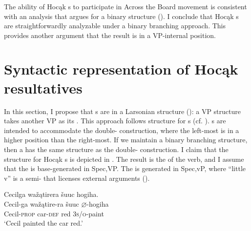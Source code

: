 \documentclass[output=paper]{LSP/langsci}
\begin{document}
The ability of Hocąk s to participate in Across the Board movement is consistent with an analysis that argues for a binary structure (\citealt{Bowers1997}). I conclude that Hocąk s are straightforwardly analyzable under a binary branching approach. This provides another argument that the result is in a VP-internal position.
 
\section{Syntactic representation of  Hocąk  resultatives}\label{sec:rosen:4}
 
In this section, I propose that s are in a Larsonian  structure (\citealt{Larson1988}): a VP structure takes another VP as its . This approach follows  structure for  s (cf. \citealt{Hoekstra1988,Carrier1992,LevinRappaportHovav1995}).  s are intended to accommodate the double- construction, where the left-most  is in a higher position than the right-most. If we maintain a binary branching structure, then a  has the same structure as the double- construction. I claim that the structure for Hocąk s is depicted in . The result  is the  of the verb, and I assume that the  is base-generated in Spec,VP. The  is generated in Spec,vP, where ``little v'' is a semi- that licenses external arguments (\citealt{Chomsky1995}).
 

\begin{exe}
\ex\label{ex:rosen:27}
\begin{xlist}

\ex \glll Cecilga wažątirera šuuc hogiha. \\
Cecil-ga  wažątire-ra šuuc {$\varnothing$}-hogiha \\
Cecil-\textsc{prop} car-\textsc{def} red \textsc{3s/o}-paint\\
\glt `Cecil painted the car red.'

\ex 
{\hspace{1em}}\newline
{}
\end{xlist}
\end{exe}
 
\end{document}

